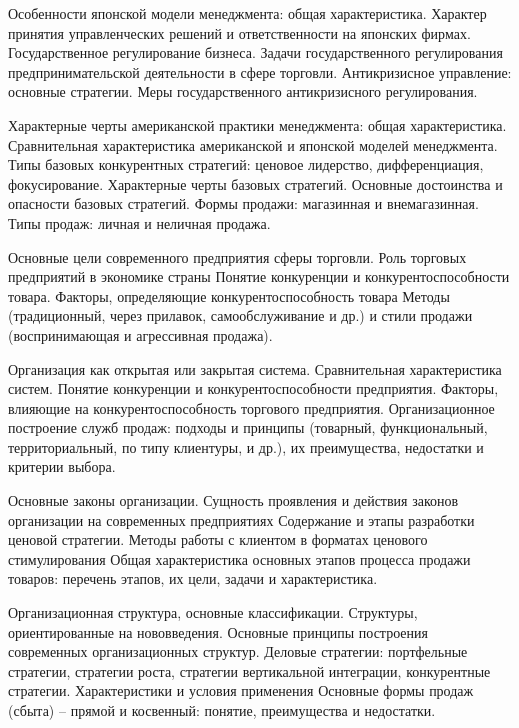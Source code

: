 \documentclass[
	11pt,
	a4paper,
	]
	{article}
\begin{document}
\bigskip

\noindent{} 
	{
		Особенности японской модели менеджмента: общая характеристика. Характер принятия управленческих решений и ответственности на японских фирмах.
	}{
		Государственное регулирование бизнеса. Задачи государственного регулирования предпринимательской деятельности в сфере торговли.
	}{
		Антикризисное управление: основные стратегии. Меры государственного антикризисного регулирования.
	}

\bigskip

\noindent{} 
	{
		Характерные черты американской практики менеджмента: общая характеристика. Сравнительная характеристика американской и японской моделей менеджмента.
	}{
		Типы базовых конкурентных стратегий: ценовое лидерство, дифференциация, фокусирование. Характерные черты базовых стратегий. Основные достоинства и опасности базовых стратегий.
	}{
		Формы продажи: магазинная и внемагазинная. Типы продаж: личная и неличная продажа.
	}

\bigskip

\noindent{} 
	{
		Основные цели современного предприятия сферы торговли. Роль торговых предприятий в экономике страны
	}{
		Понятие конкуренции и конкурентоспособности товара. Факторы, определяющие конкурентоспособность товара
	}{
		Методы (традиционный, через прилавок, самообслуживание и др.) и стили продажи (воспринимающая и агрессивная продажа).
	}

\bigskip

\noindent{} 
	{
		Организация как открытая или закрытая система. Сравнительная характеристика систем.
	}{
		Понятие конкуренции и конкурентоспособности предприятия. Факторы, влияющие на конкурентоспособность торгового предприятия.
	}{
		Организационное построение служб продаж: подходы и принципы (товарный, функциональный, территориальный, по типу клиентуры, и др.), их преимущества, недостатки и критерии выбора.
	}

\bigskip

\noindent{} 
	{
		Основные законы организации. Сущность проявления и действия законов организации на современных предприятиях
	}{
		Содержание и этапы разработки ценовой стратегии. Методы работы с клиентом в форматах ценового стимулирования
	}{
		Общая характеристика основных этапов процесса продажи товаров: перечень этапов, их цели, задачи и характеристика.
	}

\bigskip

\noindent{} 
	{
		Организационная структура, основные классификации. Структуры, ориентированные на нововведения. Основные принципы построения современных организационных структур.
	}{
		Деловые стратегии: портфельные стратегии, стратегии роста, стратегии вертикальной интеграции, конкурентные стратегии. Характеристики и условия применения
	}{
		Основные формы продаж (сбыта) – прямой и косвенный: понятие, преимущества и недостатки.
	}
\end{document}
